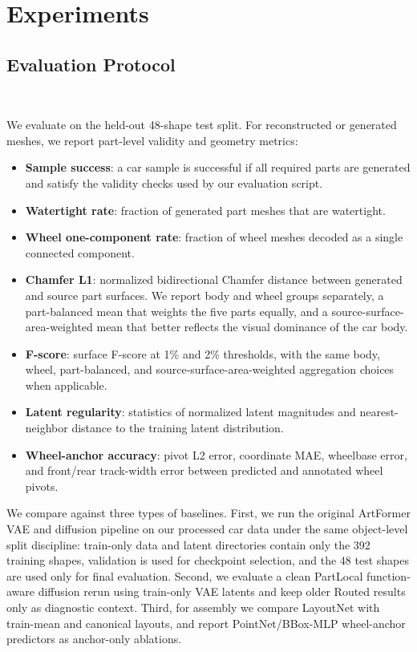 \documentclass[10pt]{article}
\newcommand{\artformer}{ArtFormer\xspace}
\begin{document}
\section{Experiments}

\subsection{Evaluation Protocol}

\ 

We evaluate on the held-out 48-shape test split. For reconstructed or generated meshes, we report part-level validity and geometry metrics:
\begin{itemize}
    \item \textbf{Sample success}: a car sample is successful if all required parts are generated and satisfy the validity checks used by our evaluation script.
    \item \textbf{Watertight rate}: fraction of generated part meshes that are watertight.
    \item \textbf{Wheel one-component rate}: fraction of wheel meshes decoded as a single connected component.
    \item \textbf{Chamfer L1}: normalized bidirectional Chamfer distance between generated and source part surfaces. We report body and wheel groups separately, a part-balanced mean that weights the five parts equally, and a source-surface-area-weighted mean that better reflects the visual dominance of the car body.
    \item \textbf{F-score}: surface F-score at 1\% and 2\% thresholds, with the same body, wheel, part-balanced, and source-surface-area-weighted aggregation choices when applicable.
    \item \textbf{Latent regularity}: statistics of normalized latent magnitudes and nearest-neighbor distance to the training latent distribution.
    \item \textbf{Wheel-anchor accuracy}: pivot L2 error, coordinate MAE, wheelbase error, and front/rear track-width error between predicted and annotated wheel pivots.
\end{itemize}

We compare against three types of baselines. First, we run the original \artformer VAE and diffusion pipeline on our processed car data under the same object-level split discipline: train-only data and latent directories contain only the 392 training shapes, validation is used for checkpoint selection, and the 48 test shapes are used only for final evaluation. Second, we evaluate a clean PartLocal function-aware diffusion rerun using train-only VAE latents and keep older Routed results only as diagnostic context. Third, for assembly we compare LayoutNet with train-mean and canonical layouts, and report PointNet/BBox-MLP wheel-anchor predictors as anchor-only ablations.
\end{document}
